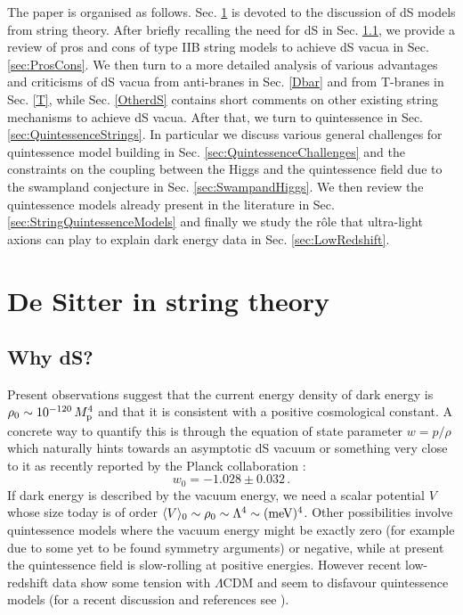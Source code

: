 \documentclass[11pt,a4paper]{article}
\newcommand{\be}{\begin{equation}}
\newcommand{\ee}{\end{equation}}
\begin{document}
The paper is organised as follows. Sec. \ref{sec:dSstrings} is devoted to the discussion of dS models from string theory. After briefly recalling the need for dS in Sec. \ref{WhydS}, we provide a review of pros and cons of type IIB string models to achieve dS vacua in Sec. \ref{sec:ProsCons}. We then turn to a more detailed analysis of various advantages and criticisms of dS vacua from anti-branes in Sec. \ref{Dbar} and from T-branes in Sec. \ref{T}, while Sec. \ref{OtherdS} contains short comments on other existing string mechanisms to achieve dS vacua. After that, we turn to quintessence in Sec. \ref{sec:QuintessenceStrings}. In particular we discuss various general challenges for quintessence model building in Sec. \ref{sec:QuintessenceChallenges} and the constraints on the coupling between the Higgs and the quintessence field due to the swampland conjecture in Sec. \ref{sec:SwampandHiggs}. We then 
 review the quintessence models already present in the literature in Sec. \ref{sec:StringQuintessenceModels} and finally we study the r\^ole that ultra-light axions can play to explain dark energy data in Sec. \ref{sec:LowRedshift}.


\section{De Sitter in string theory}
\label{sec:dSstrings}

\subsection{Why dS?}
\label{WhydS}

Present observations suggest that the current energy density of dark energy is $\rho_0 \sim 10^{-120}\,M_{\rm p}^4$ and that it is consistent with a positive cosmological constant. A concrete way to quantify this is through the equation of state parameter $w=p/\rho$ which naturally hints towards an asymptotic dS vacuum or something very close to it as recently reported by the Planck collaboration \cite{Aghanim:2018eyx}:
\be
w_0=-1.028\pm 0.032\,.
\ee
If dark energy is described by the vacuum energy, we need a scalar potential $V$ whose size today is of order $\langle V\rangle_0 \sim \rho_0\sim \Lambda^4 \sim ({\rm meV})^4$. Other possibilities involve quintessence models where the vacuum energy might be exactly zero (for example due to some yet to be found symmetry arguments) or negative, while at present the quintessence field is slow-rolling at positive energies. However recent low-redshift data show some tension with $\Lambda$CDM and seem to disfavour quintessence models (for a recent discussion and references see \cite{Wang:2018fng, Capozziello:2018jya, Dutta:2018vmq}).
\end{document}
